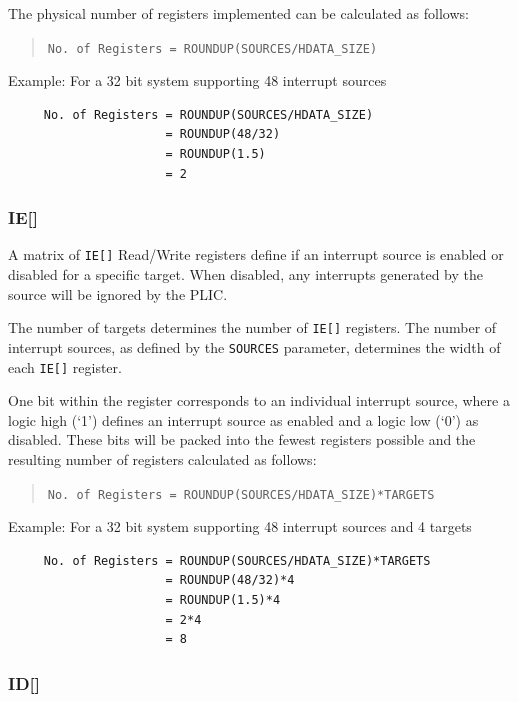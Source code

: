 The physical number of registers implemented can be calculated as
follows:

\begin{quote}
	\texttt{No.\ of\ Registers\ =\ ROUNDUP(SOURCES/HDATA\_SIZE)}
\end{quote}

Example: For a 32 bit system supporting 48 interrupt sources

\begin{verbatim}
     No. of Registers = ROUNDUP(SOURCES/HDATA_SIZE)   
                      = ROUNDUP(48/32)
                      = ROUNDUP(1.5)
                      = 2
\end{verbatim}

\subsubsection{IE[]}

A matrix of \texttt{IE[]} Read/Write registers define if an
interrupt source is enabled or disabled for a specific target. When
disabled, any interrupts generated by the source will be ignored by the
PLIC.

The number of targets determines the number of \texttt{IE[]}
registers. The number of interrupt sources, as defined by the
\texttt{SOURCES} parameter, determines the width of each \texttt{IE[]} 
register. 

One bit within the register corresponds to an individual interrupt
source, where a logic high (`1') defines an interrupt source as enabled and a
logic low (`0') as disabled. These bits will be packed into the fewest registers
possible and the resulting number of registers calculated as follows:

\begin{quote}
	\texttt{No.\ of\ Registers\ =\ ROUNDUP(SOURCES/HDATA\_SIZE)*TARGETS}
\end{quote}

Example: For a 32 bit system supporting 48 interrupt sources and 4
targets

\begin{verbatim}
     No. of Registers = ROUNDUP(SOURCES/HDATA_SIZE)*TARGETS
                      = ROUNDUP(48/32)*4
                      = ROUNDUP(1.5)*4
                      = 2*4
                      = 8
\end{verbatim}

\subsubsection{ID[]}

